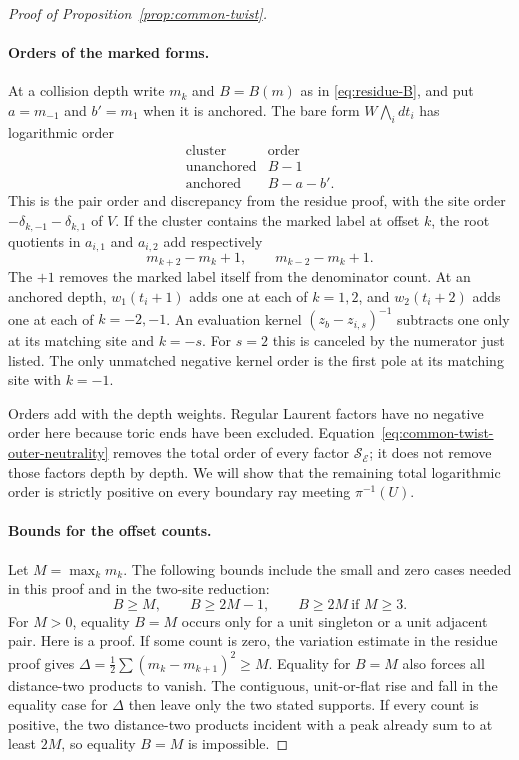 \begin{proof}[Proof of Proposition~\ref{prop:common-twist}]
\paragraph{Orders of the marked forms.}
At a collision depth write $m_k$ and $B=B(m)$ as in
\eqref{eq:residue-B}, and put $a=m_{-1}$ and $b'=m_1$ when it is
anchored. The bare form $W\bigwedge_i dt_i$ has logarithmic order
\begin{equation}\label{eq:common-twist-bare-orders}
\begin{array}{c|c}
\text{cluster}&\text{order}\\ \hline
\text{unanchored}&B-1\\
\text{anchored}&B-a-b'.
\end{array}
\end{equation}
This is the pair order and discrepancy from the residue proof, with
the site order $-\delta_{k,-1}-\delta_{k,1}$ of $V$.
If the cluster contains the marked label at offset $k$, the root
quotients in $a_{i,1}$ and $a_{i,2}$ add respectively
\begin{equation}\label{eq:common-twist-mark-orders}
 m_{k+2}-m_k+1,\qquad m_{k-2}-m_k+1.
\end{equation}
The $+1$ removes the marked label itself from the denominator count.
At an anchored depth, $w_1(t_i+1)$ adds one at each of $k=1,2$,
and $w_2(t_i+2)$ adds one at each of $k=-2,-1$. An evaluation kernel
$(z_b-z_{i,s})^{-1}$ subtracts one only at its matching site and
$k=-s$. For $s=2$ this is canceled by the numerator just listed.
The only unmatched negative kernel order is the first pole at its
matching site with $k=-1$.

Orders add with the depth weights. Regular Laurent factors have no
negative order here because toric ends have been excluded.
Equation~\eqref{eq:common-twist-outer-neutrality} removes the total
order of every factor $\mathcal S_{\mathcal E}$; it does not remove
those factors depth by depth. We will show that the remaining total
logarithmic order is strictly positive on every boundary ray meeting
$\pi^{-1}(U)$.

\paragraph{Bounds for the offset counts.}
Let $M=\max_km_k$. The following bounds include the small and zero
cases needed in this proof and in the two-site reduction:
\begin{equation}\label{eq:common-twist-B-bounds}
 B\ge M,\qquad B\ge2M-1,\qquad
 B\ge2M\ \text{if }M\ge3.
\end{equation}
For $M>0$, equality $B=M$ occurs only for a unit singleton or a
unit adjacent pair. Here is a proof. If some count is zero, the
variation estimate in the residue proof gives
$\Delta=\frac12\sum(m_k-m_{k+1})^2\ge M$. Equality for $B=M$
also forces all distance-two products to vanish. The contiguous,
unit-or-flat rise and fall in the equality case for $\Delta$ then
leave only the two stated supports. If every count is positive, the
two distance-two products incident with a peak already sum to at
least $2M$, so equality $B=M$ is impossible.


\end{proof}
